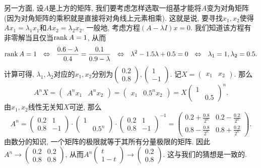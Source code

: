 另一方面, 设$A$是上方的矩阵, 我们要考虑怎样选取一组基才能将$A$变为对角矩阵(因为对角矩阵的乘积就是直接将对角线上元素相乘). 这就是说, 要寻找$x_1,x_2$使得$Ax_1=\lambda _1x_1$和$Ax_2=\lambda _2x_2$. 一般地, 考虑方程$(A-\lambda I)x=0$. 我们知道该方程有非零解当且仅当$\operatorname{rank} A=1$, 从而$$\operatorname{rank} A=1 ~~\Leftrightarrow ~~ \frac{0.6-\lambda}{0.4} = \frac{0.1}{0.9-\lambda} ~~\Leftrightarrow ~~ \lambda ^2-1.5\lambda +0.5=0 ~~\Leftrightarrow ~~ \lambda _1=1, \lambda _2=0.5. $$
计算可得, $\lambda _1,\lambda _2$对应的$x_1,x_2$分别为$\begin{pmatrix}
0.2 \\ 0.8
\end{pmatrix},\begin{pmatrix}
1 \\ -1
\end{pmatrix}$. 记$X=\begin{pmatrix}
	x_1 & x_2
\end{pmatrix}$. 那么$$A^n X = \begin{pmatrix}
	A^nx_1 & A^nx_2
\end{pmatrix} = \begin{pmatrix}
	x_1 & 0.5^nx_2
\end{pmatrix} = X\begin{pmatrix}
	1 & \\ & 0.5
\end{pmatrix}^n. $$
由$x_1,x_2$线性无关知$X$可逆, 那么$$A^n = \begin{pmatrix}
	0.2 & 1 \\ 0.8 & -1
\end{pmatrix} \cdot \begin{pmatrix}
	1 & \\ & 0.5^n
\end{pmatrix} \cdot \begin{pmatrix}
	0.2 & 1 \\ 0.8 & -1
\end{pmatrix}^{-1} = \begin{pmatrix}
	0.2+\frac{0.8}{2^n} & 0.2-\frac{0.2}{2^n} \\ 0.8-\frac{0.8}{2^n} & 0.8+\frac{0.2}{2^n}
\end{pmatrix}. $$
由数分的知识, 一个矩阵的极限就等于其所有分量极限的矩阵. 因此$A^n \to \begin{pmatrix}
	0.2 & 0.2 \\ 0.8 & 0.8
\end{pmatrix}$, 从而$A^n \begin{pmatrix}
t \\
1-t
\end{pmatrix} \to \begin{pmatrix}
0.2 \\ 0.8
\end{pmatrix}$. 这与我们的猜想是一致的. 

